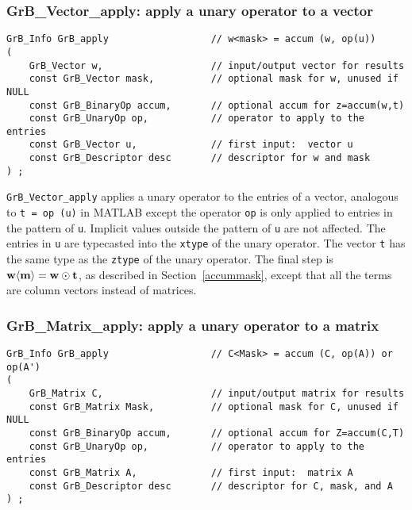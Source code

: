 \documentclass[12pt]{article}
\begin{document}
\subsubsection{{\sf GrB\_Vector\_apply:} apply a unary operator to a vector}
\label{apply_vector}

\begin{mdframed}[userdefinedwidth=6in]
{\footnotesize
\begin{verbatim}
GrB_Info GrB_apply                  // w<mask> = accum (w, op(u))
(
    GrB_Vector w,                   // input/output vector for results
    const GrB_Vector mask,          // optional mask for w, unused if NULL
    const GrB_BinaryOp accum,       // optional accum for z=accum(w,t)
    const GrB_UnaryOp op,           // operator to apply to the entries
    const GrB_Vector u,             // first input:  vector u
    const GrB_Descriptor desc       // descriptor for w and mask
) ;
\end{verbatim} } \end{mdframed}

\verb'GrB_Vector_apply' applies a unary operator to the entries of a vector,
analogous to \verb't = op (u)'  in MATLAB except the operator \verb'op' is only
applied to entries in the pattern of \verb'u'.  Implicit values outside the
pattern of \verb'u' are not affected.  The entries in \verb'u' are typecasted
into the \verb'xtype' of the unary operator.  The vector \verb't' has the same
type as the \verb'ztype' of the unary operator.  The final step is ${\bf w
\langle m \rangle  = w \odot t}$, as described in Section~\ref{accummask},
except that all the terms are column vectors instead of matrices.

\newpage
\subsubsection{{\sf GrB\_Matrix\_apply:} apply a unary operator to a matrix}
\label{apply_matrix}

\begin{mdframed}[userdefinedwidth=6in]
{\footnotesize
\begin{verbatim}
GrB_Info GrB_apply                  // C<Mask> = accum (C, op(A)) or op(A')
(
    GrB_Matrix C,                   // input/output matrix for results
    const GrB_Matrix Mask,          // optional mask for C, unused if NULL
    const GrB_BinaryOp accum,       // optional accum for Z=accum(C,T)
    const GrB_UnaryOp op,           // operator to apply to the entries
    const GrB_Matrix A,             // first input:  matrix A
    const GrB_Descriptor desc       // descriptor for C, mask, and A
) ;
\end{verbatim} } \end{mdframed}
\end{document}
